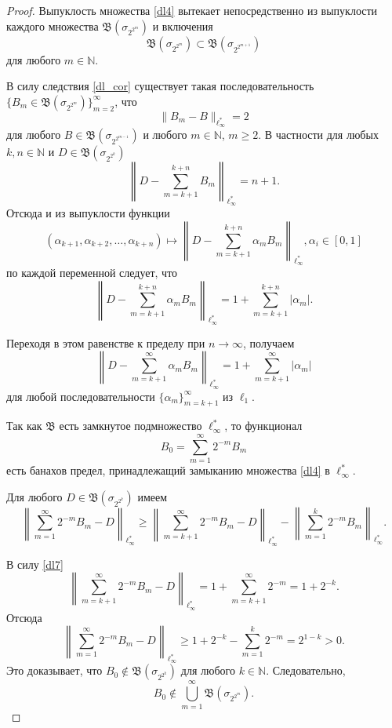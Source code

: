 \documentclass[12pt]{article}
\def\N{{\mathbb{N}}}
\def\B{{\mathfrak{B}}}
\begin{document}
\begin{proof}
Выпуклость множества \eqref{dl4} вытекает непосредственно из выпуклости каждого множества $\mathfrak B(\sigma_{2^{2^m}})$ и включения
\begin{equation}\label{dl5}
\mathfrak B(\sigma_{2^{2^m}}) \subset \mathfrak B(\sigma_{2^{2^{m+1}}})
\end{equation}
для любого $m\in \N$.

В силу следствия \ref{dl_cor} существует такая последовательность $\{B_m \in \mathfrak B(\sigma_{2^{2^m}})\}_{m=2}^\infty$, что
\begin{equation}\label{dl6}
\|B_m-B\|_{\ell_\infty^*}=2
\end{equation}
для любого $B \in \mathfrak B(\sigma_{2^{2^{m-1}}})$ и любого $m\in \N$, $m\ge2$. В частности для любых $k,n\in\N$ и $D\in \mathfrak B(\sigma_{2^{2^k}})$
$$\left\|D-\sum_{m=k+1}^{k+n}B_m\right\|_{\ell_\infty^*}=n+1.$$
Отсюда и из выпуклости функции
$$(\alpha_{k+1}, \alpha_{k+2}, \dots, \alpha_{k+n}) \mapsto \left\|D-\sum_{m=k+1}^{k+n}\alpha_mB_m\right\|_{\ell_\infty^*}, \alpha_i \in[0,1]$$
по каждой переменной следует, что
$$\left\|D-\sum_{m=k+1}^{k+n}\alpha_mB_m\right\|_{\ell_\infty^*} = 1+ \sum_{m=k+1}^{k+n}|\alpha_m|. $$

Переходя в этом равенстве к пределу при $n\to\infty$, получаем
\begin{equation}\label{dl7}
\left\|D-\sum_{m=k+1}^\infty\alpha_mB_m\right\|_{\ell_\infty^*} = 1+ \sum_{m=k+1}^\infty|\alpha_m|
\end{equation}
для любой последовательности $\{\alpha_m\}_{m=k+1}^\infty$ из $\ell_1$.

Так как $\B$ есть замкнутое подмножество $\ell_\infty^*$, то функционал
$$B_0=\sum_{m=1}^\infty 2^{-m}B_m$$
есть банахов предел, принадлежащий замыканию множества \eqref{dl4} в $\ell_\infty^*$.

Для любого $D\in \mathfrak B(\sigma_{2^{2^k}})$ имеем
$$\left\|\sum_{m=1}^\infty 2^{-m}B_m-D\right\|_{\ell_\infty^*}\ge \left\|\sum_{m=k+1}^\infty 2^{-m}B_m-D\right\|_{\ell_\infty^*}-\left\|\sum_{m=1}^k 2^{-m}B_m\right\|_{\ell_\infty^*}.$$

В силу \eqref{dl7}
$$\left\|\sum_{m=k+1}^\infty 2^{-m}B_m-D\right\|_{\ell_\infty^*} = 1+ \sum_{m=k+1}^\infty 2^{-m}=1+2^{-k}.$$
Отсюда
$$\left\|\sum_{m=1}^\infty 2^{-m}B_m-D\right\|_{\ell_\infty^*}\ge 1+2^{-k} - \sum_{m=1}^k 2^{-m}= 2^{1-k}>0.$$
Это доказывает, что $B_0\notin \mathfrak B(\sigma_{2^{2^k}})$ для любого $k\in\N$. Следовательно,
$$B_0\notin \bigcup_{m=1}^\infty\mathfrak B(\sigma_{2^{2^m}}).$$
\end{proof}
\end{document}

